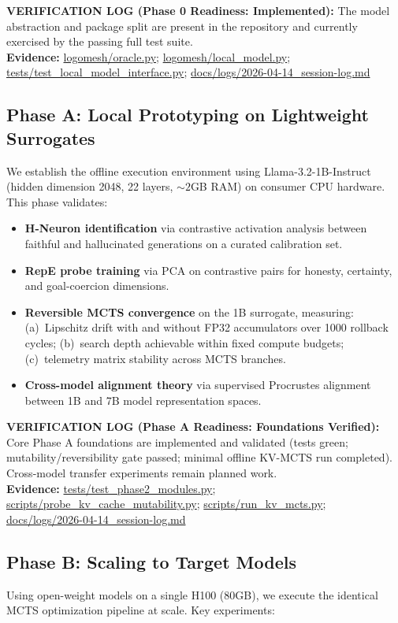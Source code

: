 \documentclass[10pt]{article}
\newcommand{\verifybox}[3]{%
\vspace{0.6em}
\noindent\colorbox{yellow!20}{%
\parbox{\dimexpr\linewidth-2\fboxsep\relax}{%
\textbf{VERIFICATION LOG (#1):} #2\\
\textbf{Evidence:} #3
}}%
\vspace{0.6em}
}
\begin{document}
\verifybox
{Phase 0 Readiness: Implemented}
{The model abstraction and package split are present in the repository and currently exercised by the passing full test suite.}
{\url{logomesh/oracle.py}; \url{logomesh/local_model.py}; \url{tests/test_local_model_interface.py}; \url{docs/logs/2026-04-14_session-log.md}}

\subsection{Phase A: Local Prototyping on Lightweight Surrogates}

We establish the offline execution environment using Llama-3.2-1B-Instruct (hidden dimension 2048, 22 layers, ${\sim}2$GB RAM) on consumer CPU hardware. This phase validates:

\begin{itemize}[leftmargin=*]
    \item \textbf{H-Neuron identification} via contrastive activation analysis between faithful and hallucinated generations on a curated calibration set.
    \item \textbf{RepE probe training} via PCA on contrastive pairs for honesty, certainty, and goal-coercion dimensions.
    \item \textbf{Reversible MCTS convergence} on the 1B surrogate, measuring: (a)~Lipschitz drift with and without FP32 accumulators over 1000 rollback cycles; (b)~search depth achievable within fixed compute budgets; (c)~telemetry matrix stability across MCTS branches.
    \item \textbf{Cross-model alignment theory} via supervised Procrustes alignment between 1B and 7B model representation spaces.
\end{itemize}

\verifybox
{Phase A Readiness: Foundations Verified}
{Core Phase A foundations are implemented and validated (tests green; mutability/reversibility gate passed; minimal offline KV-MCTS run completed). Cross-model transfer experiments remain planned work.}
{\url{tests/test_phase2_modules.py}; \url{scripts/probe_kv_cache_mutability.py}; \url{scripts/run_kv_mcts.py}; \url{docs/logs/2026-04-14_session-log.md}}

\subsection{Phase B: Scaling to Target Models}

Using open-weight models on a single H100 (80GB), we execute the identical MCTS optimization pipeline at scale. Key experiments:
\end{document}
